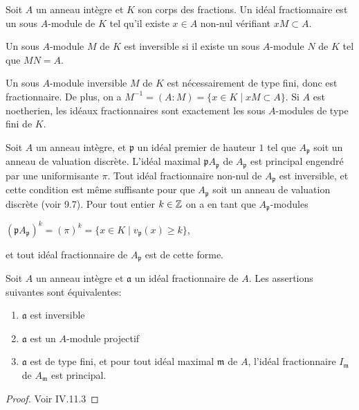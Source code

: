 \begin{defn}
Soit $A$ un anneau intègre et $K$ son corps des fractions. Un idéal fractionnaire est un sous $A$-module de $K$ tel qu'il existe $x\in A$ non-nul vérifiant $xM\subset A$.
\end{defn}

\begin{defn}\label{DefIdealInvertible}
Un sous $A$-module $M$ de $K$ est inversible si il existe un sous $A$-module $N$ de $K$ tel que $MN=A$.
\end{defn}

Un sous $A$-module inversible $M$ de $K$ est nécessairement de type fini, donc est fractionnaire. De plus, on a $M^{-1}=(A:M)=\lbrace x\in K\mid xM\subset A\rbrace$. Si $A$ est noetherien, les idéaux fractionnaires sont exactement les sous $A$-modules de type fini de $K$. 

Soit $A$ un anneau intègre, et $\mathfrak{p}$ un idéal premier de hauteur $1$ tel que $A_\mathfrak{p}$ soit un anneau de valuation discrète. L'idéal maximal $\mathfrak{p}A_\mathfrak{p}$ de $A_\mathfrak{p}$ est principal engendré par une uniformisante $\pi$. Tout idéal fractionnaire non-nul de $A_\mathfrak{p}$ est inversible, et cette condition est même suffisante pour que $A_\mathfrak{p}$ soit un anneau de valuation discrète (voir \cite{atiyahmacdo} 9.7). Pour tout entier $k\in \mathbb{Z}$ on a en tant que $A_\mathfrak{p}$-modules
\begin{center}
$(\mathfrak{p}A_\mathfrak{p})^k=(\pi)^k=\lbrace x\in K\mid v_\mathfrak{p}(x)\geq k \rbrace$,
\end{center}
et tout idéal fractionnaire de $A_\mathfrak{p}$ est de cette forme.


\begin{thm}\label{ideauxinversibles}
Soit $A$ un anneau intègre et $\mathfrak{a}$ un idéal fractionnaire de $A$. Les assertions suivantes sont équivalentes:
\begin{enumerate}
\item $\mathfrak{a}$ est inversible
\item $\mathfrak{a}$ est un $A$-module projectif
\item $\mathfrak{a}$ est de type fini, et pour tout idéal maximal $\mathfrak{m}$ de $A$, l'idéal fractionnaire $I_\mathfrak{m}$ de $A_\mathfrak{m}$ est principal.
\end{enumerate}
\end{thm}
\begin{proof}
Voir \cite{Matsumura} IV.11.3
\end{proof}

